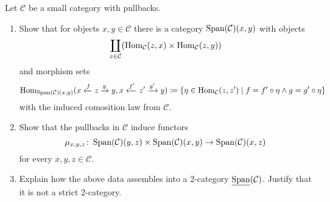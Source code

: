 \begin{Exercise}
	Let $ \mathcal{ C } $ be a small category with pullbacks.
	
	\begin{enumerate}[label=(\alph*)]
		\item 
		Show that for objects $ x , y \in \mathcal{ C } $ there is a category $ \operatorname{Span} ( \mathcal{ C } ) ( x , y ) $ with objects
		\[
		\coprod_{ z \in \mathcal{ C } } ( \operatorname{Hom}_{ \mathcal{ C } }  ( z , x ) \times \operatorname{Hom}_{ \mathcal{ C } } ( z , y ) )
		\]
		and morphism sets
		\[
		\operatorname{Hom}_{ \operatorname{Span} ( \mathcal{ C } ) ( x , y ) } ( x \xleftarrow{f} z \xrightarrow{g} y,
		x \xleftarrow{f'} z'
		\xrightarrow{g'} y )
		\coloneqq
		\{ \eta \in \operatorname{Hom}_{ \mathcal{ C }} ( z , z' ) \mid f = f' \circ \eta \wedge g = g' \circ \eta \}
		\]
		with the induced comosition law from $ \mathcal{ C } $.
		
		\item 
		Show that the pullbacks in $ \mathcal{ C } $ induce functors 
		\[
		\mu_{ x , y , z } \colon \operatorname{Span} ( \mathcal{ C } ) ( y , z ) \times \operatorname{Span} ( \mathcal{ C } ) ( x , y )  \to 
		\operatorname{Span} ( \mathcal{ C } ) ( x , z ) 
		\]
		for every $ x , y , z \in \mathcal{ C } $.
		
		\item 
		Explain how the above data assembles into a 2-category $ \underline{ \operatorname{Span} } ( \mathcal{ C } )$. Justify that it is not a strict 2-category.
	\end{enumerate}
\end{Exercise}

